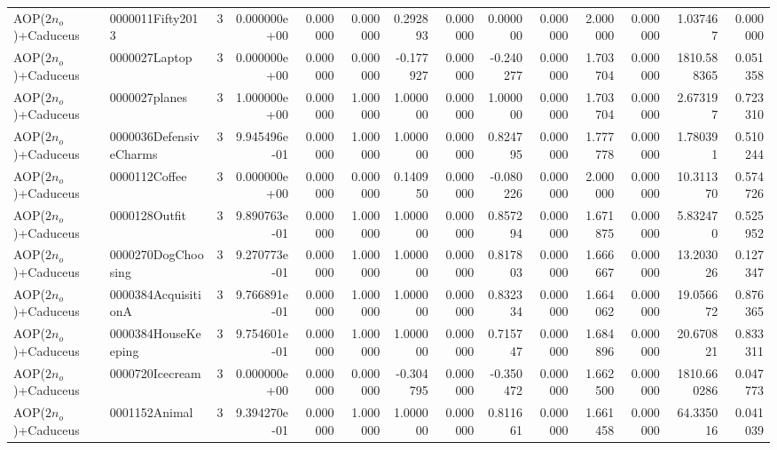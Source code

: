 \begin{tabular}{llrr|r|rr|rr|rr|rrr}
    AOP($2 n_o$)+Caduceus &       0000011Fifty2013 &       3 & 0.000000e+00 & 0.000000 & 0.000000 &      0.292893 & 0.000000 &      0.000000 & 0.000000 &      2.000000 &    0.000000 &     1.037467 &    0.000000 \\
    AOP($2 n_o$)+Caduceus &          0000027Laptop &       3 & 0.000000e+00 & 0.000000 & 0.000000 &     -0.177927 & 0.000000 &     -0.240277 & 0.000000 &      1.703704 &    0.000000 &  1810.588365 &    0.051358 \\
    AOP($2 n_o$)+Caduceus &          0000027planes &       3 & 1.000000e+00 & 0.000000 & 1.000000 &      1.000000 & 0.000000 &      1.000000 & 0.000000 &      1.703704 &    0.000000 &     2.673197 &    0.723310 \\
    AOP($2 n_o$)+Caduceus & 0000036DefensiveCharms &       3 & 9.945496e-01 & 0.000000 & 1.000000 &      1.000000 & 0.000000 &      0.824795 & 0.000000 &      1.777778 &    0.000000 &     1.780391 &    0.510244 \\
    AOP($2 n_o$)+Caduceus &          0000112Coffee &       3 & 0.000000e+00 & 0.000000 & 0.000000 &      0.140950 & 0.000000 &     -0.080226 & 0.000000 &      2.000000 &    0.000000 &    10.311370 &    0.574726 \\
    AOP($2 n_o$)+Caduceus &          0000128Outfit &       3 & 9.890763e-01 & 0.000000 & 1.000000 &      1.000000 & 0.000000 &      0.857294 & 0.000000 &      1.671875 &    0.000000 &     5.832470 &    0.525952 \\
    AOP($2 n_o$)+Caduceus &     0000270DogChoosing &       3 & 9.270773e-01 & 0.000000 & 1.000000 &      1.000000 & 0.000000 &      0.817803 & 0.000000 &      1.666667 &    0.000000 &    13.203026 &    0.127347 \\
    AOP($2 n_o$)+Caduceus &    0000384AcquisitionA &       3 & 9.766891e-01 & 0.000000 & 1.000000 &      1.000000 & 0.000000 &      0.832334 & 0.000000 &      1.664062 &    0.000000 &    19.056672 &    0.876365 \\
    AOP($2 n_o$)+Caduceus &    0000384HouseKeeping &       3 & 9.754601e-01 & 0.000000 & 1.000000 &      1.000000 & 0.000000 &      0.715747 & 0.000000 &      1.684896 &    0.000000 &    20.670821 &    0.833311 \\
    AOP($2 n_o$)+Caduceus &        0000720Icecream &       3 & 0.000000e+00 & 0.000000 & 0.000000 &     -0.304795 & 0.000000 &     -0.350472 & 0.000000 &      1.662500 &    0.000000 &  1810.660286 &    0.047773 \\
    AOP($2 n_o$)+Caduceus &          0001152Animal &       3 & 9.394270e-01 & 0.000000 & 1.000000 &      1.000000 & 0.000000 &      0.811661 & 0.000000 &      1.661458 &    0.000000 &    64.335016 &    0.041039 \\

\end{tabular}
